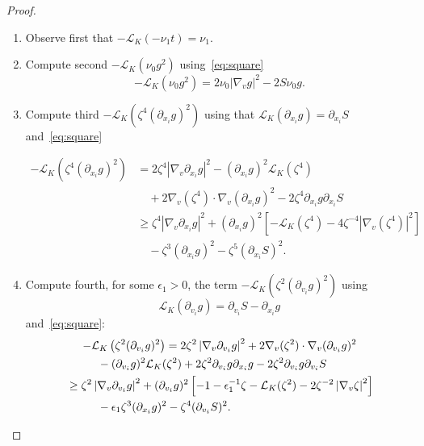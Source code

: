 \documentclass[AHL,Unicode,longabstracts,published]{cedram}
\newcommand{\cL}{\mathcal{L}}
\newcommand*{\romanenumi}{\renewcommand*{\theenumi}{\roman{enumi}}}
\begin{document}
\begin{proof}
\begin{enumerate}\romanenumi
\item \label{proofprop3.1.i} Observe first that $-\cL_K (-\nu_1t) = \nu_1$.

\item \label{proofprop3.1.ii} Compute second $-\cL_K (\nu_0 g^2)$ using~\eqref{eq:square}
\begin{equation}\label{eq:mu}
- \cL_K(\nu_0 g^2) = 2\nu_0 |\nabla_v g|^2 - 2 S \nu_0 g.
\end{equation}

\item \label{proofprop3.1.iii}Compute third $- \cL_K(\zeta^4 (\partial_{x_i}g)^2)$ using that $\mathcal L_K(\partial_{x_i}g)=\partial_{x_i}S$ and~\eqref{eq:square}

\begin{equation}\label{eq:zeta}
\begin{aligned}
- \cL_K\left(\zeta^4(\partial_{x_i}g)^2\right) & = 2 \zeta^4 \left|\nabla_v\partial_{x_i}g\right|^2 - (\partial_{x_i}g)^2 \cL_K \left(\zeta^4\right)
\\
& \quad + 2 \nabla_v (\zeta^4) \cdot
\nabla_v (\partial_{x_i} g)^2 - 2 \zeta^4 \partial_{x_i}g
\partial_{x_i}S \\
& \ge \zeta^4 \left|\nabla_v
\partial_{x_i}g\right|^2 + (\partial_{x_i}g)^2
\left[- \cL_K (\zeta^4) - 4 \zeta^{-4} \left|\nabla_v (\zeta^4)\right|^2 \right] \\
& \quad - \zeta^3 (\partial_{x_i}g)^2 - \zeta^5 (\partial_{x_i}S)^2.
\end{aligned}
\end{equation}

\item \label{proofprop3.1.iv}Compute fourth, for some $\epsilon_1>0$, the term $- \cL_K(\zeta^2(\partial_{v_i}g)^2)$ using
\[
\cL_K (\partial_{v_i} g) = \partial_{v_i}S -
\partial_{x_i}g
\]
and~\eqref{eq:square}:
\begin{multline}\label{eq:barbarzeta}
- \cL_K\left(\zeta^2 (\partial_{v_i}g)^2\right)
 = 2 \zeta^2 \left|\nabla_v \partial_{v_i} g\right|^2 + 2 \nabla_v (\zeta^2) \cdot \nabla_v (\partial_{v_i} g)^2 \\
\begin{aligned}
& \mkern50mu- (\partial_{v_i} g)^2 \cL_K (\zeta^2) + 2 \zeta^2
\partial_{v_i} g \partial_{x_i} g -2 \zeta^2 \partial_{v_i}g \partial_{v_i} S \\
& \ge \zeta^2 \left|\nabla_v \partial_{v_i} g\right|^2 + (\partial_{v_i} g)^2 \left[- 1 -
\epsilon_1 ^{-1} \zeta -
\cL_K (\zeta^2) - 2 \zeta^{-2} \left|\nabla_v
\zeta\right|^2\right] \\
& \mkern50mu - \epsilon_1 \zeta^3 (\partial_{x_i}g)^2 - \zeta^4 (\partial_{v_i} S)^2.
\end{aligned}
\end{multline}


\end{enumerate}
\end{proof}
\end{document}
